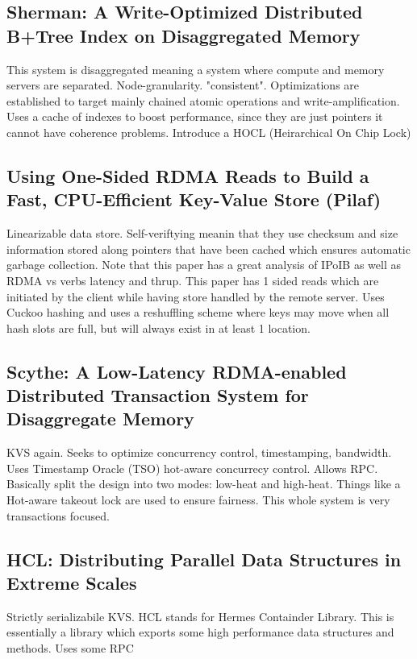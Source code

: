 \documentclass[sigplan,nonacm]{acmart}
\begin{document}
    \subsection{Sherman: A Write-Optimized Distributed B+Tree Index on Disaggregated Memory}
    This system is disaggregated meaning a system where compute and memory servers are separated. 
    Node-granularity. "consistent". Optimizations are established
    to target mainly chained atomic operations and write-amplification. Uses a cache of indexes to boost 
    performance, since they are just pointers it cannot have coherence problems. Introduce a 
    HOCL (Heirarchical On Chip Lock)\cite{Wang-SIGMOD-2022}

    \subsection{Using One-Sided RDMA Reads to Build a Fast, CPU-Efficient Key-Value Store (Pilaf) }
    Linearizable data store.  Self-veriftying meanin that they use checksum and size information stored along pointers
    that have been cached which ensures automatic garbage collection. Note that this paper has a great 
    analysis of IPoIB as well as RDMA vs verbs latency and thrup. This paper has 1 sided reads which are 
    initiated by the client while having store handled by the remote server. Uses Cuckoo hashing and uses 
    a reshuffling scheme where keys may move when all hash slots are full, but will always exist in at least 1 location.\cite{Mitchell-ATC-2013}

    
    \subsection{Scythe: A Low-Latency RDMA-enabled Distributed Transaction System for Disaggregate Memory }
    KVS again. Seeks to optimize concurrency control, timestamping, bandwidth. Uses Timestamp Oracle (TSO)
    hot-aware concurrecy control. Allows RPC. Basically split the design into two modes: low-heat and high-heat.
    Things like a Hot-aware takeout lock are used to ensure fairness. This whole system is very transactions focused. \cite{Lu-ACMtrans-2024}

    \subsection{HCL: Distributing Parallel Data Structures in Extreme Scales}
    Strictly serializabile KVS. HCL stands for Hermes Containder Library. This is essentially a library 
    which exports some high performance data structures and methods. Uses some RPC\cite{Devarajan-CLUSTER-2020}
\end{document}
